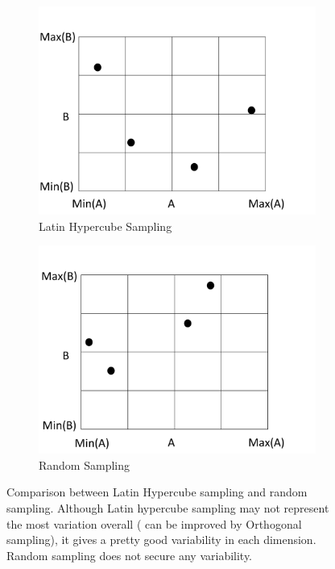 \documentclass[11pt]{report}
\numberwithin{equation}{chapter}
\begin{document}
\begin{spacing}{2}
\begin{figure}
\begin{subfigure}{0.5\textwidth}
\centering
\includegraphics[scale = 0.3]{LHS.pdf}
\caption{Latin Hypercube Sampling}
\end{subfigure}
\begin{subfigure}{0.5\textwidth}
\centering
\includegraphics[scale = 0.3]{RS.pdf}
\caption{Random Sampling}
\end{subfigure}
\caption{Comparison between Latin Hypercube sampling and random sampling. Although Latin hypercube sampling may not represent the most variation overall ( can be improved by Orthogonal sampling), it gives a pretty good variability in each dimension. Random sampling does not secure any variability. }
\end{figure}




\end{spacing}
\end{document}
